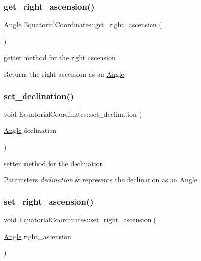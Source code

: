 \subsubsection{\texorpdfstring{get\+\_\+right\+\_\+ascension()}{get\_right\_ascension()}}
{\footnotesize\ttfamily \mbox{\hyperlink{classAngle}{Angle}} Equatorial\+Coordinates\+::get\+\_\+right\+\_\+ascension (\begin{DoxyParamCaption}{ }\end{DoxyParamCaption})}



getter method for the right ascension 

\begin{DoxyReturn}{Returns}
the right ascension as an \mbox{\hyperlink{classAngle}{Angle}} 
\end{DoxyReturn}
\mbox{\label{classEquatorialCoordinates_ad3136302cdf4904010f22407071aa722}} 
\subsubsection{\texorpdfstring{set\+\_\+declination()}{set\_declination()}}
{\footnotesize\ttfamily void Equatorial\+Coordinates\+::set\+\_\+declination (\begin{DoxyParamCaption}\item[{\mbox{\hyperlink{classAngle}{Angle}}}]{declination }\end{DoxyParamCaption})}



setter method for the declination 


\begin{DoxyParams}{Parameters}
{\em declination} & represents the declination as an \mbox{\hyperlink{classAngle}{Angle}} \\
\hline
\end{DoxyParams}
\mbox{\label{classEquatorialCoordinates_ad6eac3da25d92a4e6c52f920d825ed43}} 
\subsubsection{\texorpdfstring{set\+\_\+right\+\_\+ascension()}{set\_right\_ascension()}}
{\footnotesize\ttfamily void Equatorial\+Coordinates\+::set\+\_\+right\+\_\+ascension (\begin{DoxyParamCaption}\item[{\mbox{\hyperlink{classAngle}{Angle}}}]{right\+\_\+ascension }\end{DoxyParamCaption})}



